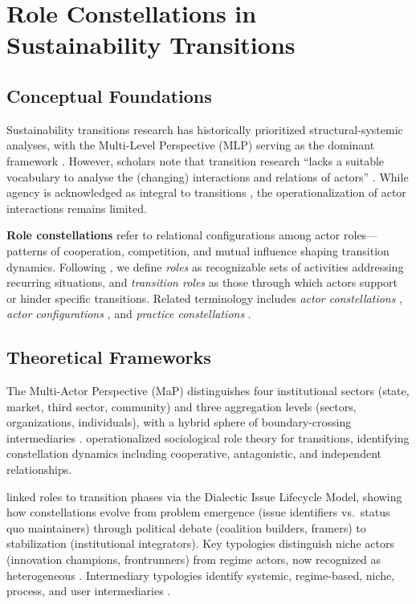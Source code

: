 \section{Role Constellations in Sustainability Transitions}
\label{sec:role-constellations}

\subsection{Conceptual Foundations}

Sustainability transitions research has historically prioritized structural-systemic analyses, with the Multi-Level Perspective (MLP) serving as the dominant framework \citep{geels2002technological}. However, scholars note that transition research ``lacks a suitable vocabulary to analyse the (changing) interactions and relations of actors'' \citep[p.~45]{wittmayer2017actor}. While agency is acknowledged as integral to transitions \citep{geels2011multi}, the operationalization of actor interactions remains limited.

\textbf{Role constellations} refer to relational configurations among actor roles---patterns of cooperation, competition, and mutual influence shaping transition dynamics. Following \citet{wittmayer2017actor}, we define \textit{roles} as recognizable sets of activities addressing recurring situations, and \textit{transition roles} as those through which actors support or hinder specific transitions. Related terminology includes \textit{actor constellations} \citep{kriesi2001swiss}, \textit{actor configurations} \citep{avelino2016shifting}, and \textit{practice constellations} \citep{shove2012dynamics}.

\subsection{Theoretical Frameworks}

The Multi-Actor Perspective (MaP) distinguishes four institutional sectors (state, market, third sector, community) and three aggregation levels (sectors, organizations, individuals), with a hybrid sphere of boundary-crossing intermediaries \citep{avelino2016shifting}. \citet{wittmayer2017actor} operationalized sociological role theory for transitions, identifying constellation dynamics including cooperative, antagonistic, and independent relationships.

\citet{bodenheimer2021lost} linked roles to transition phases via the Dialectic Issue Lifecycle Model, showing how constellations evolve from problem emergence (issue identifiers vs.\ status quo maintainers) through political debate (coalition builders, framers) to stabilization (institutional integrators). Key typologies distinguish niche actors (innovation champions, frontrunners) from regime actors, now recognized as heterogeneous \citep{kungl2025incumbent}. Intermediary typologies identify systemic, regime-based, niche, process, and user intermediaries \citep{kivimaa2019typology}.

